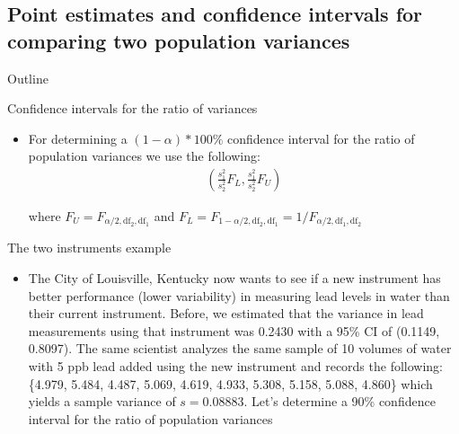 \documentclass[xcolor=dvipsnames]{beamer}
\begin{document}
\subsection{Point estimates and confidence intervals for comparing two population variances}
\begin{frame}{Outline}
	\tableofcontents[currentsection,subsectionstyle=show/shaded/hide]
\end{frame}

\begin{frame}{Confidence intervals for the ratio of variances}
	\begin{itemize}
		\item For determining a $(1-\alpha)*100 \%$ confidence interval for the ratio of population variances we use the following: 
		\begin{gather*}
			\left(\frac{s_1^2}{s_2^2} F_L, \frac{s_1^2}{s_2^2} F_U \right)
		\end{gather*}
					
		where $F_U = F_{\alpha / 2, \text{df}_2, \text{df}_1}$ and $F_L = F_{1-\alpha / 2, \text{df}_2, \text{df}_1} = 1 / F_{\alpha / 2, \text{df}_1, \text{df}_2}$
	\end{itemize}
\end{frame}

\begin{frame}{The two instruments example}
	\begin{itemize}
			\item The City of Louisville, Kentucky now wants to see if a new instrument has better performance (lower variability) in measuring lead levels in water than their current instrument. Before, we estimated that the variance in lead measurements using that instrument was 0.2430 with a 95\% CI of (0.1149, 0.8097). The same scientist analyzes the same sample of 10 volumes of water with 5 ppb lead added using the new instrument and records the following: \{4.979, 5.484, 4.487, 5.069, 4.619, 4.933, 5.308, 5.158, 5.088, 4.860\} which yields a sample variance of $s = 0.08883$. Let's determine a 90\% confidence interval for the ratio of population variances
	\end{itemize}
\end{frame}
\end{document}
